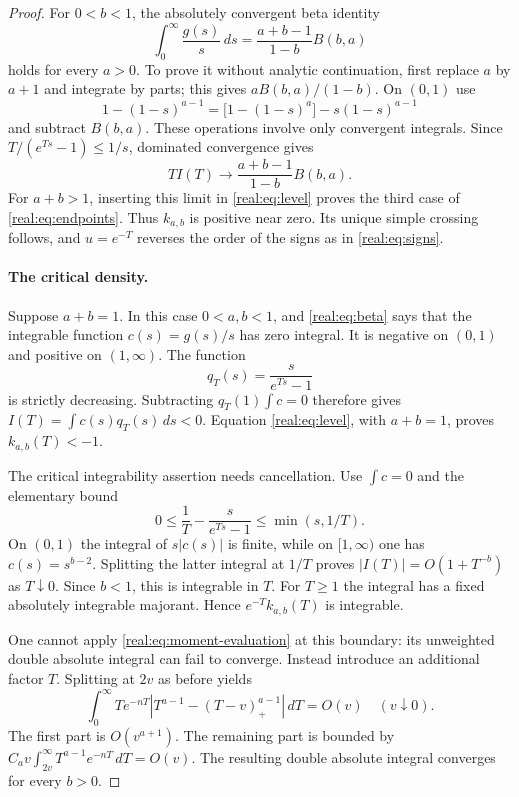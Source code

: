 \begin{proof}
For $0<b<1$, the absolutely convergent beta identity
\begin{equation}\label{real:eq:beta}
 \int_0^\infty\frac{g(s)}s\,ds
 =\frac{a+b-1}{1-b}B(b,a)
\end{equation}
holds for every $a>0$. To prove it without analytic continuation,
first replace $a$ by $a+1$ and integrate by parts; this gives
$aB(b,a)/(1-b)$. On $(0,1)$ use
\[
 1-(1-s)^{a-1}=\bigl[1-(1-s)^a\bigr]-s(1-s)^{a-1}
\]
and subtract $B(b,a)$. These operations involve only convergent
integrals. Since $T/(e^{Ts}-1)\leq1/s$, dominated convergence gives
\[
 TI(T)\longrightarrow\frac{a+b-1}{1-b}B(b,a).
\]
For $a+b>1$, inserting this limit in \eqref{real:eq:level} proves
the third case of \eqref{real:eq:endpoints}. Thus $k_{a,b}$ is
positive near zero. Its unique simple crossing follows, and
$u=e^{-T}$ reverses the order of the signs as in
\eqref{real:eq:signs}.

\paragraph{The critical density.}
Suppose $a+b=1$. In this case $0<a,b<1$, and
\eqref{real:eq:beta} says that the integrable function
$c(s)=g(s)/s$ has zero integral. It is negative on $(0,1)$ and
positive on $(1,\infty)$. The function
\[
 q_T(s)=\frac{s}{e^{Ts}-1}
\]
is strictly decreasing. Subtracting $q_T(1)\int c=0$ therefore gives
$I(T)=\int c(s)q_T(s)\,ds<0$. Equation
\eqref{real:eq:level}, with $a+b=1$, proves $k_{a,b}(T)<-1$.

The critical integrability assertion needs cancellation. Use
$\int c=0$ and the elementary bound
\[
 0\leq\frac1T-\frac{s}{e^{Ts}-1}\leq\min(s,1/T).
\]
On $(0,1)$ the integral of $s|c(s)|$ is finite, while on
$[1,\infty)$ one has $c(s)=s^{b-2}$. Splitting the latter integral
at $1/T$ proves $|I(T)|=O(1+T^{-b})$ as $T\downarrow0$.
Since $b<1$, this is integrable in $T$. For $T\geq1$ the integral
has a fixed absolutely integrable majorant. Hence
$e^{-T}k_{a,b}(T)$ is integrable.

One cannot apply \eqref{real:eq:moment-evaluation} at this boundary:
its unweighted double absolute integral can fail to converge.
Instead introduce an additional factor $T$. Splitting at $2v$ as
before yields
\begin{equation}\label{real:eq:extra-T}
 \int_0^\infty T e^{-nT}
 \left|T^{a-1}-(T-v)_+^{a-1}\right|\,dT=O(v)
 \quad(v\downarrow0).
\end{equation}
The first part is $O(v^{a+1})$. The remaining part is bounded by
$C_av\int_{2v}^\infty T^{a-1}e^{-nT}\,dT=O(v)$.
The resulting double absolute integral converges for every $b>0$.


\end{proof}
